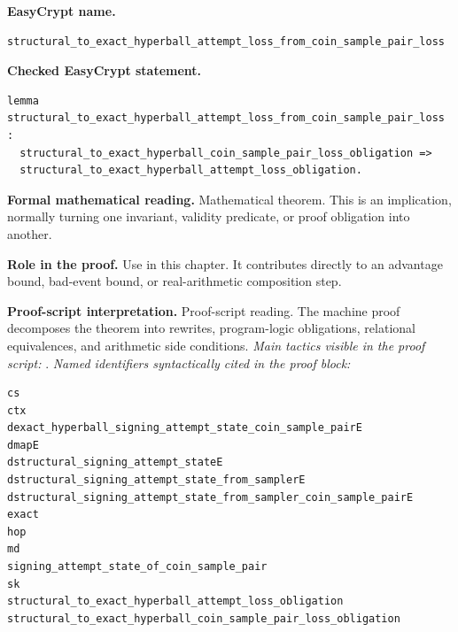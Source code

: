 \begin{formaltheorem}
\noindent\textbf{EasyCrypt name.}
\begin{lstlisting}[language=EasyCrypt,basicstyle=\ttfamily\scriptsize]
structural_to_exact_hyperball_attempt_loss_from_coin_sample_pair_loss
\end{lstlisting}
\noindent\textbf{Checked EasyCrypt statement.}
\begin{lstlisting}[language=EasyCrypt,basicstyle=\ttfamily\scriptsize]
lemma structural_to_exact_hyperball_attempt_loss_from_coin_sample_pair_loss :
  structural_to_exact_hyperball_coin_sample_pair_loss_obligation =>
  structural_to_exact_hyperball_attempt_loss_obligation.
\end{lstlisting}
\noindent\textbf{Formal mathematical reading.}
Mathematical theorem. This is an implication, normally turning one invariant, validity predicate, or proof obligation into another.

\noindent\textbf{Role in the proof.}
Use in this chapter. It contributes directly to an advantage bound, bad-event bound, or real-arithmetic composition step.

\noindent\textbf{Proof-script interpretation.}
Proof-script reading. The machine proof decomposes the theorem into rewrites, program-logic obligations, relational equivalences, and arithmetic side conditions.
\emph{Main tactics visible in the proof script:} .
\emph{Named identifiers syntactically cited in the proof block:}
\begin{lstlisting}[language=EasyCrypt,basicstyle=\ttfamily\scriptsize]
cs
ctx
dexact_hyperball_signing_attempt_state_coin_sample_pairE
dmapE
dstructural_signing_attempt_stateE
dstructural_signing_attempt_state_from_samplerE
dstructural_signing_attempt_state_from_sampler_coin_sample_pairE
exact
hop
md
signing_attempt_state_of_coin_sample_pair
sk
structural_to_exact_hyperball_attempt_loss_obligation
structural_to_exact_hyperball_coin_sample_pair_loss_obligation
\end{lstlisting}

\end{formaltheorem}

